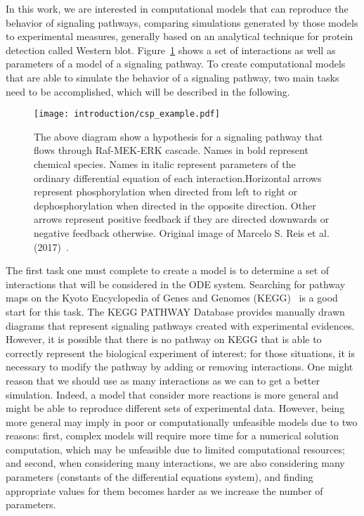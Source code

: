 In this work, we are interested in computational models that can 
reproduce the behavior of signaling pathways, comparing simulations
generated by those models to experimental measures, generally based on
an analytical technique for protein detection called 
Western blot. Figure~\ref{fig:signal_pathway_example} shows a
set of interactions as well as parameters of a model of a signaling 
pathway. To create computational models that are able to simulate the 
behavior of a signaling pathway, two main tasks need to be 
accomplished, which will be described in the following.

\begin{figure}[!ht]
\centering 
    \texttt{[image: introduction/csp\_example.pdf]}
\caption{The above diagram show a hypothesis for a signaling pathway 
    that flows through Raf-MEK-ERK cascade. Names in bold represent 
    chemical species. Names in italic represent parameters of the 
    ordinary differential equation of each interaction.Horizontal arrows
    represent phosphorylation when directed from left to right or 
    dephosphorylation when directed in the opposite direction. Other 
    arrows represent positive feedback if they are directed downwards or 
    negative feedback otherwise. Original image of Marcelo S. Reis et
    al. (2017)~\cite{Reis2017}.}
\label{fig:signal_pathway_example}
\end{figure}

The first task one must complete to create a model is to determine a set 
of interactions that will be considered in the ODE system. Searching for 
pathway maps on the Kyoto Encyclopedia of Genes and Genomes 
(KEGG)~\cite{Kanehisa2000kegg} is a good start for this task. The KEGG 
PATHWAY Database provides manually drawn diagrams that represent 
signaling pathways created with experimental evidences. However, it is 
possible that there is no pathway on KEGG that is able to correctly 
represent the biological experiment of interest; for those situations, 
it is necessary to modify the pathway by adding or removing 
interactions. One might reason that we should use as many interactions 
as we can to get a better simulation. Indeed, a model that consider more
reactions is more general and might be able to reproduce different sets
of experimental data. However, being more general may imply in poor or 
computationally unfeasible models due to two reasons: first, 
complex models will require more time for a numerical solution 
computation, which may be unfeasible due to limited computational 
resources; and second, when considering many interactions, we are also 
considering many parameters (constants of the differential equations 
system), and finding appropriate values for them becomes harder as we 
increase the number of parameters.

